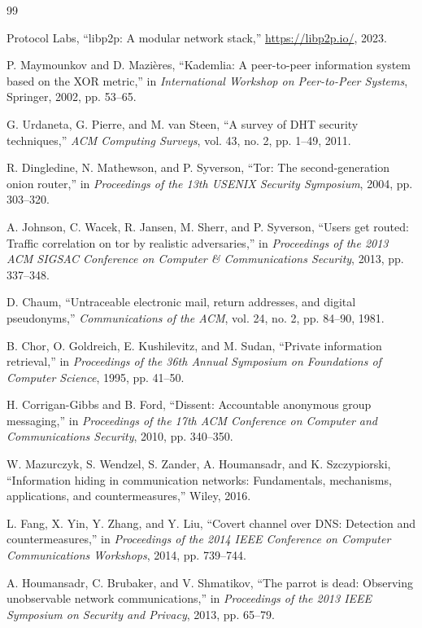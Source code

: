 \documentclass[11pt,a4paper]{article}
\theoremstyle{definition}
\theoremstyle{remark}
\begin{document}

\begin{thebibliography}{99}

Protocol Labs, ``libp2p: A modular network stack,'' \url{https://libp2p.io/}, 2023.

P. Maymounkov and D. Mazi\`{e}res, ``Kademlia: A peer-to-peer information system based on the XOR metric,'' in \emph{International Workshop on Peer-to-Peer Systems}, Springer, 2002, pp. 53--65.

G. Urdaneta, G. Pierre, and M. van Steen, ``A survey of DHT security techniques,'' \emph{ACM Computing Surveys}, vol. 43, no. 2, pp. 1--49, 2011.

R. Dingledine, N. Mathewson, and P. Syverson, ``Tor: The second-generation onion router,'' in \emph{Proceedings of the 13th USENIX Security Symposium}, 2004, pp. 303--320.

A. Johnson, C. Wacek, R. Jansen, M. Sherr, and P. Syverson, ``Users get routed: Traffic correlation on tor by realistic adversaries,'' in \emph{Proceedings of the 2013 ACM SIGSAC Conference on Computer \& Communications Security}, 2013, pp. 337--348.

D. Chaum, ``Untraceable electronic mail, return addresses, and digital pseudonyms,'' \emph{Communications of the ACM}, vol. 24, no. 2, pp. 84--90, 1981.

B. Chor, O. Goldreich, E. Kushilevitz, and M. Sudan, ``Private information retrieval,'' in \emph{Proceedings of the 36th Annual Symposium on Foundations of Computer Science}, 1995, pp. 41--50.

H. Corrigan-Gibbs and B. Ford, ``Dissent: Accountable anonymous group messaging,'' in \emph{Proceedings of the 17th ACM Conference on Computer and Communications Security}, 2010, pp. 340--350.

W. Mazurczyk, S. Wendzel, S. Zander, A. Houmansadr, and K. Szczypiorski, ``Information hiding in communication networks: Fundamentals, mechanisms, applications, and countermeasures,'' Wiley, 2016.

L. Fang, X. Yin, Y. Zhang, and Y. Liu, ``Covert channel over DNS: Detection and countermeasures,'' in \emph{Proceedings of the 2014 IEEE Conference on Computer Communications Workshops}, 2014, pp. 739--744.

A. Houmansadr, C. Brubaker, and V. Shmatikov, ``The parrot is dead: Observing unobservable network communications,'' in \emph{Proceedings of the 2013 IEEE Symposium on Security and Privacy}, 2013, pp. 65--79.


\end{thebibliography}
\end{document}
